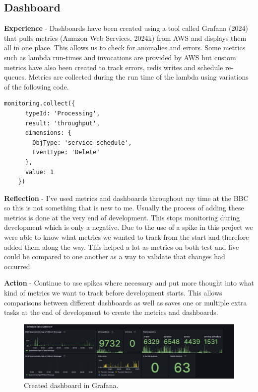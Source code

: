   \newpage
  \subsection{Dashboard}

  \textbf{Experience} - Dashboards have been created using a tool called Grafana (2024) that pulls metrics (Amazon Web Services, 2024k) from AWS and
  displays them all in one place. This allows us to check for anomalies and errors. Some metrics such as lambda run-times and invocations are provided by 
  AWS but custom metrics have also been created to track errors, redis writes and schedule re-queues. Metrics are collected during the run time of the 
  lambda using variations of the following code.

   \begin{lstlisting}[caption=Code used to update a metric\, this variation tracks a schedule delete.]
    monitoring.collect({
      typeId: 'Processing',
      result: 'throughput',
      dimensions: {
        ObjType: 'service_schedule',
        EventType: 'Delete'
      },
      value: 1
    })
  \end{lstlisting}

  \textbf{Reflection} - I've used metrics and dashboards throughout my time at the BBC so this is not something that is new to me. Usually the process of 
  adding these metrics is done at the very end of development. This stops monitoring during development which is only a negative. Due to the use of a spike 
  in this project we were able to know what metrics we wanted to track from the start and therefore added them along the way. This helped a lot as metrics on 
  both test and live could be compared to one another as a way to validate that changes had occurred.
  
  \vspace{0.2cm}
  \textbf{Action} - Continue to use spikes where necessary and put more thought into what kind of metrics we want to track before development starts.
  This allows comparisons between different dashboards as well as saves one or multiple extra tasks at the end of development to create the metrics and
  dashboards.

  \begin{figure}[H]
    \centering
    \includegraphics[width=12cm]{assets/outputs/dashboard.png}
    \caption{Created dashboard in Grafana.}
    \label{fig:dashboard}
  \end{figure}
  
